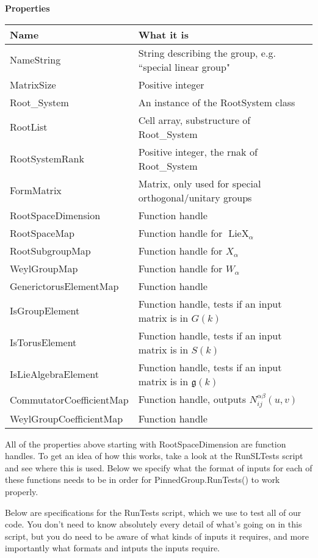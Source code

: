 \documentclass[12pt]{article}
\theoremstyle{definition}
\numberwithin{theorem}{subsection}
\newcommand{\tbf}{\textbf}
\newcommand{\frakg}{\mathfrak{g}}
\DeclareMathOperator{\LieX}{LieX}
\begin{document}
\begin{center}
\tbf{Properties}
\end{center}

\begin{center}
	\begin{tabular}{l|l}
		Name & What it is \\
		\hline
		NameString & String describing the group, e.g. ``special linear group" \\
		MatrixSize & Positive integer \\
		Root\_System & An instance of the RootSystem class \\
		RootList & Cell array, substructure of Root\_System \\
		RootSystemRank & Positive integer, the rnak of Root\_System \\
		FormMatrix & Matrix, only used for special orthogonal/unitary groups \\
		RootSpaceDimension & Function handle \\
		RootSpaceMap & Function handle for $\LieX_\alpha$ \\
		RootSubgroupMap & Function handle for $X_\alpha$ \\
		WeylGroupMap & Function handle for $W_\alpha$ \\
		GenerictorusElementMap & Function handle \\
		IsGroupElement & Function handle, tests if an input matrix is in $G(k)$ \\
		IsTorusElement & Function handle, tests if an input matrix is in $S(k)$ \\
		IsLieAlgebraElement & Function handle, tests if an input matrix is in $\frakg(k)$ \\
		CommutatorCoefficientMap & Function handle, outputs $N_{ij}^{\alpha \beta}(u,v)$ \\
		WeylGroupCoefficientMap & Function handle
	\end{tabular}
\end{center}

All of the properties above starting with RootSpaceDimension are function handles. To get an idea of how this works, take a look at the RunSLTests script and see where this is used. Below we specify what the format of inputs for each of these functions needs to be in order for PinnedGroup.RunTests() to work properly.

Below are specifications for the RunTests script, which we use to test all of our code. You don't need to know absolutely every detail of what's going on in this script, but you do need to be aware of what kinds of inputs it requires, and more importantly what formats and intputs the inputs require. 
\end{document}

